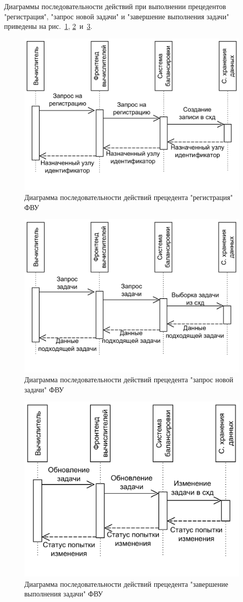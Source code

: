 \documentclass[a4paper,12pt]{report}
\numberwithin{equation}{section}
\begin{document}
Диаграммы последовательности действий при выполнении прецедентов "регистрация", "запрос новой задачи" и "завершение выполнения задачи" приведены на рис.~\ref{fig:seq-reg}, \ref{fig:seq-req}~и~\ref{fig:seq-sub}.

\begin{figure}
  \centering
  \includegraphics[width=.7\linewidth]{diagrams/frontnode/seq-register}
  \caption{Диаграмма последовательности действий прецедента "регистрация" ФВУ}
  \label{fig:seq-reg}
\end{figure}

\begin{figure}
  \centering
  \includegraphics[width=.7\linewidth]{diagrams/frontnode/seq-request}
  \caption{Диаграмма последовательности действий прецедента "запрос новой задачи" ФВУ}
  \label{fig:seq-req}
\end{figure}

\begin{figure}
  \centering
  \includegraphics[width=.7\linewidth]{diagrams/frontnode/seq-submit}
  \caption{Диаграмма последовательности действий прецедента "завершение выполнения задачи" ФВУ}
  \label{fig:seq-sub}
\end{figure}
\end{document}
